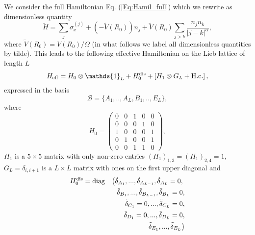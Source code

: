 \documentclass[prl,aps,twocolumn,showpacs,superscriptaddress,longbibliography]{revtex4-1}
\begin{document}
We consider the full Hamiltonian Eq. (\ref{Eq:Hamil_full}) which we rewrite as dimensionless quantity
\begin{equation}
	\tilde{H} = \sum_j \sigma_x^{(j)} + (-\tilde{V}(R_0)) n_j + \tilde{V}(R_0) \sum_{j>k} \frac{n_j n_k}{|j-k|^\alpha},
\end{equation}
where $\tilde{V}(R_0) = V(R_0)/\Omega$ (in what follows we label all dimensionless quantities by tilde). This leads to the following effective Hamiltonian on the Lieb lattice of length $L$ 
\begin{equation}
	H_{\rm eff} = H_0 \otimes \mathds{1}_L + H_0^{\rm dis} + \left[ H_1 \otimes G_L + {\rm H.c.} \right],
	\label{eq:H eff}
\end{equation}
expressed in the basis
\begin{equation}
	\mathcal{B}=\{A_1,..,A_L,B_1,..,E_L\},
	\label{eq:basis}
\end{equation}
where
\begin{equation}
	H_0 =
 \begin{pmatrix}
  	 0 & 0 & 1 & 0 & 0 \\
     0 & 0 & 0 & 1 & 0 \\
     1 & 0 & 0 & 0 & 1 \\
     0 & 1 & 0 & 0 & 1 \\
     0 & 0 & 1 & 1 & 0
 \end{pmatrix},
\end{equation}
$H_1$ is a $5 \times 5$ matrix with only non-zero entries $(H_1)_{1,3}=(H_1)_{2,4}=1$, $G_L = \delta_{i,i+1}$ is a $L \times L$ matrix with ones on the first upper diagonal and 
\begin{eqnarray}
	H_0^{\rm dis} = {\rm diag} & & \left( \tilde{\delta}_{A_1},...,\tilde{\delta}_{A_{L-1}},\tilde{\delta}_{A_{L}}=0, \right. \nonumber \\
									  & & \tilde{\delta}_{B_1},...,\tilde{\delta}_{B_{L-1}},\tilde{\delta}_{B_{L}}=0, \nonumber \\
									  & & \tilde{\delta}_{C_1}=0,...,\tilde{\delta}_{C_{L}}=0, \nonumber \\
									  & & \tilde{\delta}_{D_1}=0,...,\tilde{\delta}_{D_{L}}=0, \nonumber \\
									  & & \left. \tilde{\delta}_{E_1},...,\tilde{\delta}_{E_{L}} \right)
	\label{eq:disorder}
\end{eqnarray}
\end{document}

